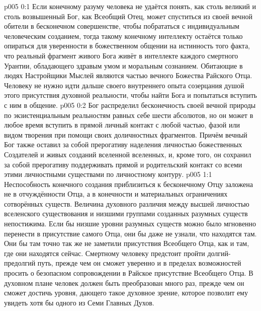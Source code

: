 \author{Божественный Советник}
\vs p005 0:1 Если конечному разуму человека не удаётся понять, как столь великий и столь возвышенный Бог, как Всеобщий Отец, может спуститься из своей вечной обители в бесконечном совершенстве, чтобы побрататься с индивидуальным человеческим созданием, тогда такому конечному интеллекту остаётся только опираться для уверенности в божественном общении на истинность того факта, что реальный фрагмент живого Бога живёт в интеллекте каждого смертного Урантии, обладающего здравым умом и моральным сознанием. Обитающие в людях Настройщики Мыслей являются частью вечного Божества Райского Отца. Человеку не нужно идти дальше своего внутреннего опыта созерцания душой этого присутствия духовной реальности, чтобы найти Бога и попытаться вступить с ним в общение.
\vs p005 0:2 Бог распределил бесконечность своей вечной природы по экзистенциальным реальностям равных себе шести абсолютов, но он может в любое время вступить в прямой личный контакт с любой частью, фазой или видом творения при помощи своих доличностных фрагментов. Причём вечный Бог также оставил за собой прерогативу наделения личностью божественных Создателей и живых созданий вселенной вселенных, и, кроме того, он сохранил за собой прерогативу поддерживать прямой и родительский контакт со всеми этими личностными существами по личностному контуру.
\vs p005 1:1 Неспособность конечного создания приблизиться к бесконечному Отцу заложена не в отчуждённости Отца, а в конечности и материальных ограничениях сотворённых существ. Величина духовного различия между высшей личностью вселенского существования и низшими группами созданных разумных существ непостижима. Если бы низшие уровни разумных существ можно было мгновенно перенести в присутствие самого Отца, они бы даже не узнали, что находятся там. Они бы там точно так же не заметили присутствия Всеобщего Отца, как и там, где они находятся сейчас. Смертному человеку предстоит пройти долгий\hyp{}предолгий путь, прежде чем он сможет уверенно и в пределах возможностей просить о безопасном сопровождении в Райское присутствие Всеобщего Отца. В духовном плане человек должен быть преобразован много раз, прежде чем он сможет достичь уровня, дающего такое духовное зрение, которое позволит ему увидеть хотя бы одного из Семи Главных Духов.
